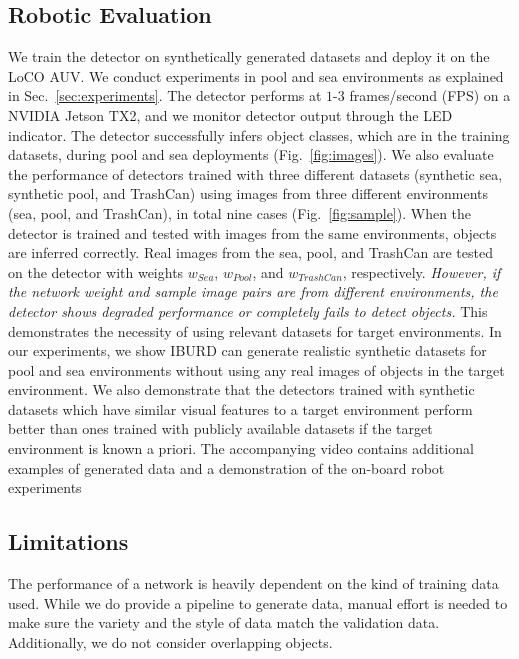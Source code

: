 \subsection{Robotic Evaluation}


We train the detector on synthetically generated datasets and deploy it on the LoCO AUV. We conduct experiments in pool and sea environments as explained in Sec.~\ref{sec:experiments}. 
The detector performs at $1$-$3$ frames/second (FPS) on a NVIDIA Jetson TX2, and we monitor detector output through the LED indicator. The detector successfully infers object classes, which are in the training datasets, during pool and sea deployments (Fig.~\ref{fig:images}). 
We also evaluate the performance of detectors trained with three different datasets (\ie synthetic sea, synthetic pool, and TrashCan) using images from three different environments (\ie sea, pool, and TrashCan), in total nine cases (Fig.~\ref{fig:sample}).
When the detector is trained and tested with images from the same environments, objects are inferred correctly. Real images from the sea, pool, and TrashCan are tested on the detector with weights $w_{Sea}$, $w_{Pool}$, and $w_{TrashCan}$, respectively.
\textit{However, if the network weight and sample image pairs are from different environments, the detector shows degraded performance or completely fails to detect objects.} 
This demonstrates the necessity of using relevant datasets for target environments. 
In our experiments, we show IBURD can generate realistic synthetic datasets for pool and sea environments without using any real images of objects in the target environment. 
We also demonstrate that the detectors trained with synthetic datasets which have similar visual features to a target environment perform better than ones trained with publicly available datasets if the target environment is known a priori. The accompanying video contains additional examples of generated data and a demonstration of the on-board robot experiments




\subsection{Limitations}
The performance of a network is heavily dependent on the kind of training data used. While we do provide a pipeline to generate data, manual effort is needed to make sure the variety and the style of data match the validation data. Additionally, we do not consider overlapping objects.
